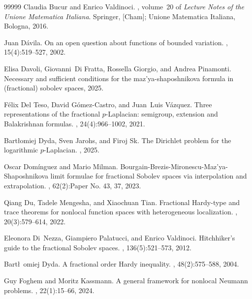 \documentclass[12pt, reqno]{amsart}%
\theoremstyle{plain}  %
\theoremstyle{definition}  %
\theoremstyle{remark}
\numberwithin{equation}{section}
\begin{document}
{\begin{thebibliography}{99999}
Claudia Bucur and Enrico Valdinoci.
, volume~20 of {\em Lecture
  Notes of the Unione Matematica Italiana}.
\newblock Springer, [Cham]; Unione Matematica Italiana, Bologna, 2016.

Juan D{\'a}vila.
\newblock On an open question about functions of bounded variation.
, 15(4):519--527,
  2002.

Elisa Davoli, Giovanni~Di Fratta, Rossella Giorgio, and Andrea Pinamonti.
\newblock Necessary and sufficient conditions for the maz'ya-shaposhnikova
  formula in (fractional) sobolev spaces, 2025.

F\'{e}lix {Del Teso}, David {G\'{o}mez-Castro}, and Juan~Luis V{\'a}zquez.
\newblock Three representations of the fractional {$p$}-{L}aplacian: semigroup,
  extension and {B}alakrishnan formulas.
, 24(4):966--1002, 2021.

Bartłomiej Dyda, Sven Jarohs, and Firoj Sk.
\newblock The {D}irichlet problem for the logarithmic {$p$-Laplacian}.
, 2025.

Oscar Dom\'inguez and Mario Milman.
\newblock Bourgain-{B}rezis-{M}ironescu-{M}az'ya-{S}haposhnikova limit formulae
  for fractional {S}obolev spaces via interpolation and extrapolation.
, 62(2):Paper No. 43,
  37, 2023.

Qiang Du, Tadele Mengesha, and Xiaochuan Tian.
\newblock Fractional {Hardy}-type and trace theorems for nonlocal function
  spaces with heterogeneous localization.
, 20(3):579--614, 2022.

Eleonora Di~Nezza, Giampiero Palatucci, and Enrico Valdinoci.
\newblock Hitchhiker's guide to the fractional {S}obolev spaces.
, 136(5):521--573, 2012.

Bart\l~omiej Dyda.
\newblock A fractional order {H}ardy inequality.
, 48(2):575--588, 2004.

Guy Foghem and Moritz Kassmann.
\newblock A general framework for nonlocal {N}eumann problems.
, 22(1):15--66, 2024.


\end{thebibliography}}
\end{document}
